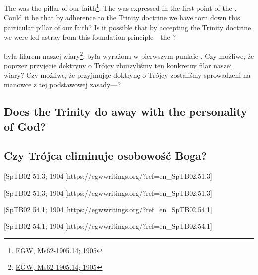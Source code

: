 The  was the pillar of our faith\footnote{\href{https://egwwritings.org/?ref=en_Ms62-1905.14}{EGW, Ms62-1905.14; 1905}}. The  was expressed in the first point of the . Could it be that by adherence to the Trinity doctrine we have torn down this particular pillar of our faith? Is it possible that by accepting the Trinity doctrine we were led astray from this foundation principle—the ?


 była filarem naszej wiary\footnote{\href{https://egwwritings.org/?ref=en_Ms62-1905.14}{EGW, Ms62-1905.14; 1905}}.  była wyrażona w pierwszym punkcie . Czy możliwe, że poprzez przyjęcie doktryny o Trójcy zburzyliśmy ten konkretny filar naszej wiary? Czy możliwe, że przyjmując doktrynę o Trójcy zostaliśmy sprowadzeni na manowce z tej podstawowej zasady—?


\subsection*{Does the Trinity do away with the personality of God?}


\subsection*{Czy Trójca eliminuje osobowość Boga?}


[SpTB02 51.3; 1904][https://egwwritings.org/?ref=en\_SpTB02.51.3]


[SpTB02 51.3; 1904][https://egwwritings.org/?ref=en\_SpTB02.51.3]


[SpTB02 54.1; 1904][https://egwwritings.org/?ref=en\_SpTB02.54.1]


[SpTB02 54.1; 1904][https://egwwritings.org/?ref=en\_SpTB02.54.1]


